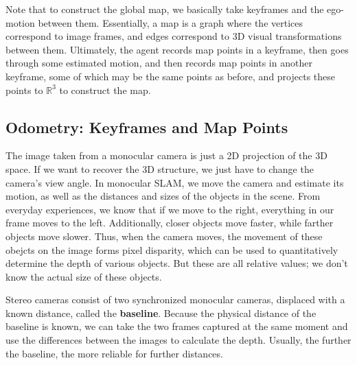 \documentclass{article}
\theoremstyle{definition}
\theoremstyle{remark}
\theoremstyle{definition}
\begin{document}
Note that to construct the global map, we basically take keyframes and the ego-motion between them. Essentially, a map is a graph where the vertices correspond to image frames, and edges correspond to 3D visual transformations between them. Ultimately, the agent records map points in a keyframe, then goes through some estimated motion, and then records map points in another keyframe, some of which may be the same points as before, and projects these points to $\mathbb{R}^3$ to construct the map. 

\subsection{Odometry: Keyframes and Map Points}

The image taken from a monocular camera is just a 2D projection of the 3D space. If we want to recover the 3D structure, we just have to change the camera's view angle. In monocular SLAM, we move the camera and estimate its motion, as well as the distances and sizes of the objects in the scene. From everyday experiences, we know that if we move to the right, everything in our frame moves to the left. Additionally, closer objects move faster, while farther objects move slower. Thus, when the camera moves, the movement of these obejcts on the image forms pixel disparity, which can be used to quantitatively determine the depth of various objects. But these are all relative values; we don't know the actual size of these objects. 

Stereo cameras consist of two synchronized monocular cameras, displaced with a known distance, called the \textbf{baseline}. Because the physical distance of the baseline is known, we can take the two frames captured at the same moment and use the differences between the images to calculate the depth. Usually, the further the baseline, the more reliable for further distances. 
\end{document}
